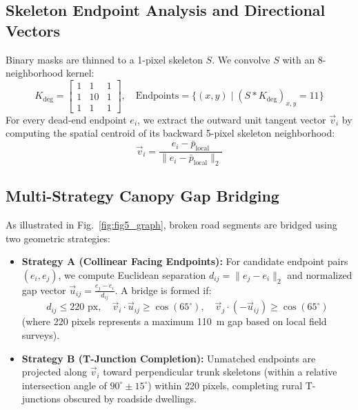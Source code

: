 \documentclass[conference]{IEEEtran}
\begin{document}
\subsection{Skeleton Endpoint Analysis and Directional Vectors}
Binary masks are thinned to a 1-pixel skeleton $S$. We convolve $S$ with an 8-neighborhood kernel:
\begin{equation}
    K_{\text{deg}} = \begin{bmatrix} 1 & 1 & 1 \\ 1 & 10 & 1 \\ 1 & 1 & 1 \end{bmatrix}, \quad \text{Endpoints} = \{(x, y) \mid (S * K_{\text{deg}})_{x,y} = 11\}
\end{equation}
For every dead-end endpoint $e_i$, we extract the outward unit tangent vector $\vec{v}_i$ by computing the spatial centroid of its backward 5-pixel skeleton neighborhood:
\begin{equation}
    \vec{v}_i = \frac{e_i - \bar{p}_{\text{local}}}{\|e_i - \bar{p}_{\text{local}}\|_2}
\end{equation}

\subsection{Multi-Strategy Canopy Gap Bridging}
As illustrated in Fig.~\ref{fig:fig5_graph}, broken road segments are bridged using two geometric strategies:
\begin{itemize}
    \item \textbf{Strategy A (Collinear Facing Endpoints):} For candidate endpoint pairs $(e_i, e_j)$, we compute Euclidean separation $d_{ij} = \|e_j - e_i\|_2$ and normalized gap vector $\vec{u}_{ij} = \frac{e_j - e_i}{d_{ij}}$. A bridge is formed if:
    \begin{equation}
        d_{ij} \le 220\text{ px}, \quad \vec{v}_i \cdot \vec{u}_{ij} \ge \cos(65^\circ), \quad \vec{v}_j \cdot (-\vec{u}_{ij}) \ge \cos(65^\circ)
    \end{equation}
    (where 220 pixels represents a maximum 110~m gap based on local field surveys).
    \item \textbf{Strategy B (T-Junction Completion):} Unmatched endpoints are projected along $\vec{v}_i$ toward perpendicular trunk skeletons (within a relative intersection angle of $90^\circ \pm 15^\circ$) within 220 pixels, completing rural T-junctions obscured by roadside dwellings.
\end{itemize}
\end{document}
